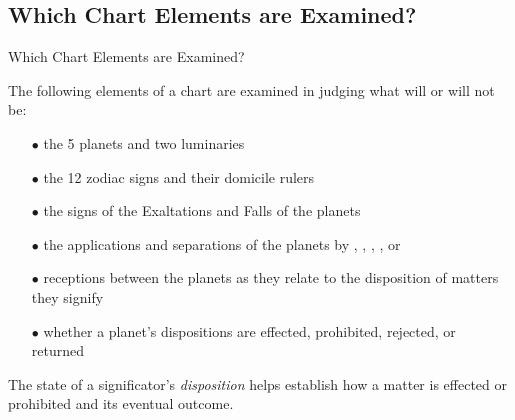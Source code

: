 \subsection{Which Chart Elements are Examined?}
\begin{frame}[t]{Which Chart Elements are Examined?}

The following elements of a chart are examined in judging what will or will not be:
\begin{itemize}
\item[$\bullet$] the 5 planets and two luminaries
\item[$\bullet$] the 12 zodiac signs and their domicile rulers
\item[$\bullet$] the signs of  the Exaltations and Falls of the planets
\item[$\bullet$] the applications and separations of the planets by \Conjunction, \Sextile, \Square, \Trine, or \Opposition\ 
\item[$\bullet$] receptions between the planets as they relate to the disposition of matters they signify
\item[$\bullet$] whether a planet's dispositions are effected, prohibited, rejected, or returned
\end{itemize}
\vspace{0.5cm}

The state of a significator's \textsl{disposition} helps establish how a matter is effected or prohibited and its eventual outcome.
\end{frame}
